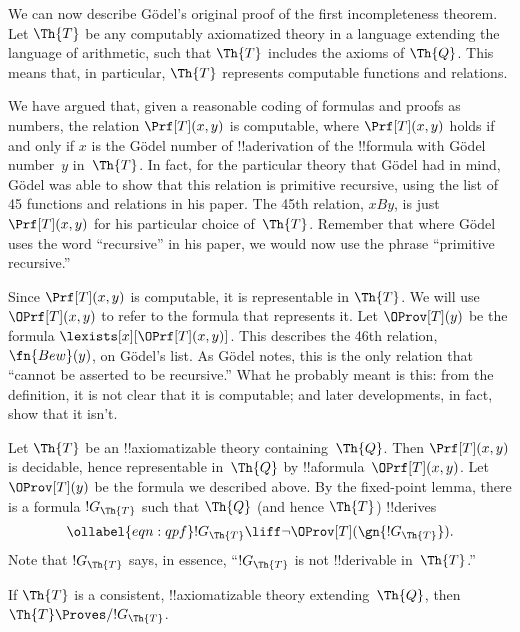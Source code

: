 \documentclass[../../../include/open-logic-section]{subfiles}
\begin{document}

We can now describe G\"odel's original proof of the first
incompleteness theorem. Let $\Th{T}$ be any computably axiomatized theory
in a language extending the language of arithmetic, such that $\Th{T}$
includes the axioms of $\Th{Q}$. This means that, in particular, $\Th{T}$
represents computable functions and relations.

We have argued that, given a reasonable coding of formulas and proofs
as numbers, the relation $\Prf[T](x,y)$ is computable, where
$\Prf[T](x,y)$ holds if and only if $x$ is the G\"odel number of
!!a{derivation} of the !!{formula} with G\"odel number~$y$
in~$\Th{T}$. In fact, for the particular theory that G\"odel had in
mind, G\"odel was able to show that this relation is primitive
recursive, using the list of 45 functions and relations in his
paper. The 45th relation, $x B y$, is just $\Prf[T](x,y)$ for his
particular choice of~$\Th{T}$. Remember that where G\"odel uses the
word ``recursive'' in his paper, we would now use the phrase
``primitive recursive.''

Since $\Prf[T](x,y)$ is computable, it is representable in $\Th{T}$. We
will use $\OPrf[T](x,y)$ to refer to the formula that represents
it. Let $\OProv[T](y)$ be the formula
$\lexists[x][\OPrf[T](x,y)]$. This describes the 46th relation,
$\fn{Bew}(y)$, on G\"odel's list. As G\"odel notes, this is the only
relation that ``cannot be asserted to be recursive.''  What he
probably meant is this: from the definition, it is not clear that it
is computable; and later developments, in fact, show that it isn't.

Let $\Th{T}$ be an !!{axiomatizable} theory containing~$\Th{Q}$. Then
$\Prf[T](x, y)$ is decidable, hence representable in~$\Th{Q}$ by
!!a{formula}~$\OPrf[T](x, y)$. Let $\OProv[T](y)$ be the formula we
described above. By the fixed-point lemma, there is a formula
$!G_\Th{T}$ such that $\Th{Q}$ (and hence $\Th{T}$) !!{derive}s
\begin{equation}
\ollabel{eqn:qpf}
!G_\Th{T} \liff \lnot \OProv[T](\gn{!G_\Th{T}}).
\end{equation}
Note that $!G_\Th{T}$ says, in essence, ``$!G_\Th{T}$ is not
!!{derivable} in~$\Th{T}$.''

\begin{lem}
If $\Th{T}$ is a consistent, !!{axiomatizable} theory
extending~$\Th{Q}$, then $\Th{T} \Proves/ !G_\Th{T}$.
\end{lem}
\end{document}
